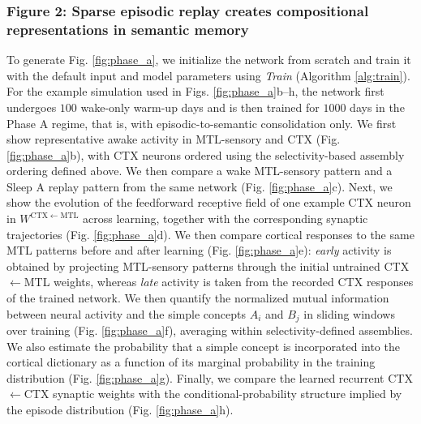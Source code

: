 \documentclass{article}
\begin{document}
\subsubsection*{Figure 2: Sparse episodic replay creates compositional representations in semantic memory}
To generate Fig. \ref{fig:phase_a}, we initialize the network from scratch and train it with the default input and model parameters using \textit{Train} (Algorithm \ref{alg:train}). For the example simulation used in Figs. \ref{fig:phase_a}b--h, the network first undergoes $100$ wake-only warm-up days and is then trained for $1000$ days in the Phase A regime, that is, with episodic-to-semantic consolidation only. We first show representative awake activity in MTL-sensory and CTX (Fig. \ref{fig:phase_a}b), with CTX neurons ordered using the selectivity-based assembly ordering defined above. We then compare a wake MTL-sensory pattern and a Sleep A replay pattern from the same network (Fig. \ref{fig:phase_a}c).
\newline\newline
Next, we show the evolution of the feedforward receptive field of one example CTX neuron in $W^{\mathrm{CTX}\leftarrow\mathrm{MTL}}$ across learning, together with the corresponding synaptic trajectories (Fig. \ref{fig:phase_a}d). We then compare cortical responses to the same MTL patterns before and after learning (Fig. \ref{fig:phase_a}e): \textit{early} activity is obtained by projecting MTL-sensory patterns through the initial untrained CTX$\leftarrow$MTL weights, whereas \textit{late} activity is taken from the recorded CTX responses of the trained network.
\newline\newline
We then quantify the normalized mutual information between neural activity and the simple concepts $A_i$ and $B_j$ in sliding windows over training (Fig. \ref{fig:phase_a}f), averaging within selectivity-defined assemblies. We also estimate the probability that a simple concept is incorporated into the cortical dictionary as a function of its marginal probability in the training distribution (Fig. \ref{fig:phase_a}g).
\newline\newline
Finally, we compare the learned recurrent CTX$\leftarrow$CTX synaptic weights with the conditional-probability structure implied by the episode distribution (Fig. \ref{fig:phase_a}h).
\end{document}
